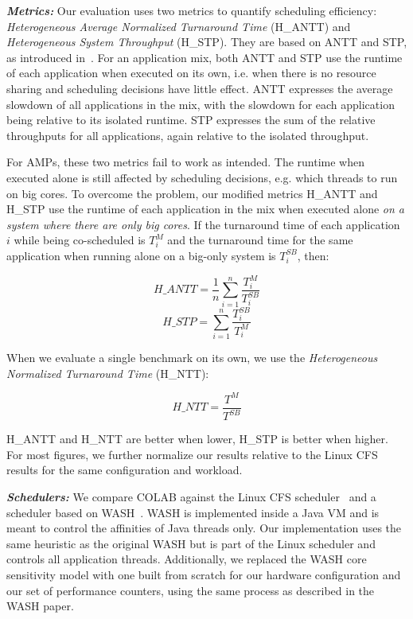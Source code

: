 \textbf{\textit{Metrics:}} Our evaluation uses two metrics to quantify scheduling efficiency: {\it Heterogeneous Average Normalized Turnaround Time} (H\_ANTT) and {\it Heterogeneous System Throughput} (H\_STP). They are based on ANTT and STP, as introduced in~\cite{eyerman2008system}. For an application mix, both ANTT and STP use the runtime of each application when executed on its own, i.e. when there is no resource sharing and scheduling decisions have little effect. ANTT expresses the average slowdown of all applications in the mix, with the slowdown for each application being relative to its isolated runtime. STP expresses the sum of the relative throughputs for all applications, again relative to the isolated throughput.

For AMPs, these two metrics fail to work as intended. The runtime when executed alone is still affected by scheduling decisions, e.g. which threads to run on big cores. To overcome the problem, our modified metrics H\_ANTT and H\_STP use the runtime of each application in the mix when executed alone \emph{on a system where there are only big cores}. If the turnaround time of each application $i$ while being co-scheduled is $T^{M}_i$ and the turnaround time for the same application when running alone on a big-only system is $T^{SB}_i$, then:

$$ H\_ANTT = \frac{1}{n}\sum^{n}_{i=1}\frac{T^{M}_i}{T^{SB}_i}$$
$$ H\_STP = \sum^{n}_{i=1}\frac{T^{SB}_i}{T^{M}_i}$$

When we evaluate a single benchmark on its own, we use the {\it Heterogeneous Normalized Turnaround Time} (H\_NTT):

$$ H\_NTT = \frac{T^{M}}{T^{SB}}$$

H\_ANTT and H\_NTT are better when lower, H\_STP is better when higher. For most figures, we further normalize our results relative to the Linux CFS results for the same configuration and workload.

\textbf{\textit{Schedulers:}}
We compare COLAB against the Linux CFS scheduler~\cite{molnar2007cfs} and a scheduler based on WASH~\cite{jibaja2016portable}. WASH is implemented inside a Java VM and is meant to control the affinities of Java threads only. Our implementation uses the same heuristic as the original WASH but is part of the Linux scheduler and controls all application threads. Additionally, we replaced the WASH core sensitivity model with one built from scratch for our hardware configuration and our set of performance counters, using the same process as described in the WASH paper.

